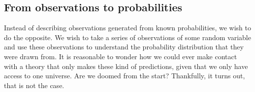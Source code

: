 
\subsection{From observations to probabilities}
    Instead of describing observations generated from known probabilities,
    we wish to do the opposite.
    We wish to take a series of observations of some random variable and use these observations
    to understand the probability distribution that they were drawn from.
    It is reasonable to wonder how we could ever make contact with a theory
    that only makes these kind of predictions, given that we only have access to one universe.
    Are we doomed from the start? Thankfully, it turns out, that is not the case.


